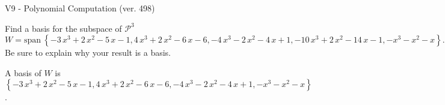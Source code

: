 \begin{exercise}
  \begin{exerciseTitle}V9 - Polynomial Computation (ver. 498)\end{exerciseTitle}
  \begin{exerciseStatement}
    Find a basis for the subspace of \(\mathcal{P}^3\) 
\[W=\mathrm{span}\ \left\{-3 \, x^{3} + 2 \, x^{2} - 5 \, x - 1 , 4 \, x^{3} + 2 \, x^{2} - 6 \, x - 6 , -4 \, x^{3} - 2 \, x^{2} - 4 \, x + 1 , -10 \, x^{3} + 2 \, x^{2} - 14 \, x - 1 , -x^{3} - x^{2} - x\right\}.\]
 Be sure to explain why your result is a basis.


  \end{exerciseStatement}
  \begin{exerciseAnswer}
   A basis of \(W\) is  \(\left\{-3 \, x^{3} + 2 \, x^{2} - 5 \, x - 1 , 4 \, x^{3} + 2 \, x^{2} - 6 \, x - 6 , -4 \, x^{3} - 2 \, x^{2} - 4 \, x + 1 , -x^{3} - x^{2} - x\right\}\).
  


  \end{exerciseAnswer}
\end{exercise}